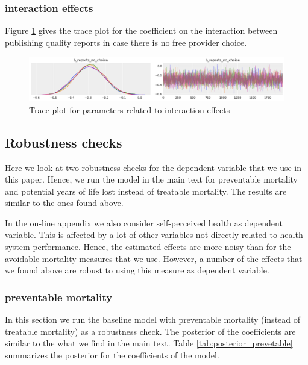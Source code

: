 \documentclass[a4paper,12pt]{article}
\begin{document}
\subsubsection{interaction effects}
\label{sec:orgc9e4eeb}

Figure \ref{fig:trace_interaction} gives the trace plot for the coefficient on the interaction between publishing quality reports in case there is no free provider choice.

\begin{figure}[htbp]
\centering
\includegraphics[width=.9\linewidth]{./figures/trace_interaction.png}
\caption{\label{fig:trace_interaction}Trace plot for parameters related to interaction effects}
\end{figure}



\subsection{Robustness checks}
\label{sec:orgd9a16e7}
\label{app:robustness}

Here we look at two robustness checks for the dependent variable that we use in this paper. Hence, we run the model in the main text for preventable mortality and potential years of life lost instead of treatable mortality. The results are similar to the ones found above.

In the on-line appendix we also consider self-perceived health as dependent variable. This is affected by a lot of other variables not directly related to health system performance. Hence, the estimated effects are more noisy than for the avoidable mortality measures that we use. However, a number  of the effects that we found above are robust to using this measure as dependent variable.

\subsubsection{preventable mortality}
\label{sec:orge059bcb}

In this section we run the baseline model with preventable mortality (instead of treatable mortality) as a robustness check. The posterior of the coefficients are similar to the what we find in the main text. Table \ref{tab:posterior_prevetable} summarizes the posterior for the coefficients of the model.
\end{document}
